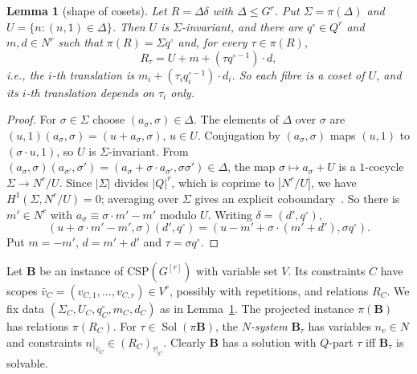 \documentclass[11pt]{article}
\newtheorem{lemma}[theorem]{Lemma}
\theoremstyle{definition}
\theoremstyle{remark}
\newcommand{\Csp}{\mathrm{CSP}}
\newcommand{\Sol}{\operatorname{Sol}}
\begin{document}
\begin{lemma}[shape of cosets]\label{lem:shape}
Let $R=\Delta\delta$ with $\Delta\le G^r$. Put $\Sigma=\pi(\Delta)$ and
$U=\{n:(n,1)\in\Delta\}$. Then $U$ is $\Sigma$-invariant, and there are
$q^\circ\in Q^r$ and $m,d\in N^r$ such that $\pi(R)=\Sigma q^\circ$ and, for
every $\tau\in\pi(R)$,
\[
R_\tau = U + m + (\tau q^{\circ-1})\cdot d ,
\]
i.e., the $i$-th translation is $m_i+(\tau_iq^{\circ-1}_i)\cdot d_i$. So each
fibre is a coset of $U$, and its $i$-th translation depends on $\tau_i$ only.
\end{lemma}
\begin{proof}
For $\sigma\in\Sigma$ choose $(a_\sigma,\sigma)\in\Delta$. The elements of
$\Delta$ over $\sigma$ are $(u,1)(a_\sigma,\sigma)=(u+a_\sigma,\sigma)$, $u\in
U$. Conjugation by $(a_\sigma,\sigma)$ maps $(u,1)$ to $(\sigma\cdot u,1)$, so
$U$ is $\Sigma$-invariant. From
$(a_\sigma,\sigma)(a_{\sigma'},\sigma')=(a_\sigma+\sigma\cdot
a_{\sigma'},\sigma\sigma')\in\Delta$, the map $\sigma\mapsto a_\sigma+U$ is a
$1$-cocycle $\Sigma\to N^r/U$. Since $|\Sigma|$ divides $|Q|^r$, which is coprime
to $|N^r/U|$, we have $H^1(\Sigma,N^r/U)=0$; averaging over $\Sigma$ gives an
explicit coboundary~\cite{Rob96}. So there is $m'\in N^r$ with
$a_\sigma\equiv\sigma\cdot m'-m'$ modulo $U$. Writing $\delta=(d',q^\circ)$,
\[
(u+\sigma\cdot m'-m',\sigma)(d',q^\circ)=(u-m'+\sigma\cdot(m'+d'),\sigma q^\circ).
\]
Put $m=-m'$, $d=m'+d'$ and $\tau=\sigma q^\circ$.
\end{proof}

Let $\mathbf B$ be an instance of $\Csp(G^{[r]})$ with variable set $V$. Its
constraints $C$ have scopes $\bar v_C=(v_{C,1},\dots,v_{C,r})\in V^r$, possibly
with repetitions, and relations $R_C$. We fix data
$(\Sigma_C,U_C,q^\circ_C,m_C,d_C)$ as in Lemma~\ref{lem:shape}. The projected
instance $\pi(\mathbf B)$ has relations $\pi(R_C)$. For
$\tau\in\Sol(\pi\mathbf B)$, the \emph{$N$-system} $\mathbf B_\tau$ has
variables $n_v\in N$ and constraints $n|_{\bar v_C}\in(R_C)_{\tau|_C}$. Clearly
$\mathbf B$ has a solution with $Q$-part $\tau$ iff $\mathbf B_\tau$ is
solvable.
\end{document}
